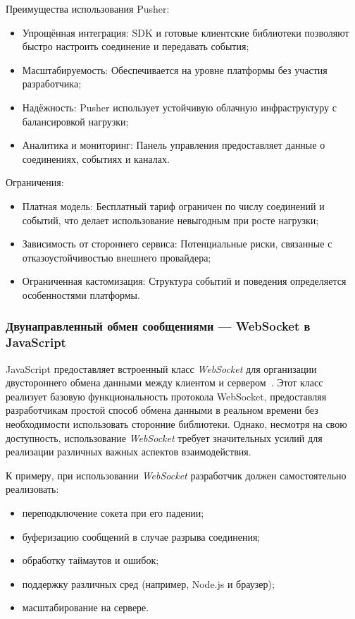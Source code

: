 Преимущества использования Pusher:
\begin{itemize}
  \item Упрощённая интеграция: SDK и готовые клиентские библиотеки позволяют быстро настроить соединение и передавать события;
  \item Масштабируемость: Обеспечивается на уровне платформы без участия разработчика;
  \item Надёжность: Pusher использует устойчивую облачную инфраструктуру с балансировкой нагрузки;
  \item Аналитика и мониторинг: Панель управления предоставляет данные о соединениях, событиях и каналах.
\end{itemize}

Ограничения:
\begin{itemize}
  \item Платная модель: Бесплатный тариф ограничен по числу соединений и событий, что делает использование невыгодным при росте нагрузки;
  \item Зависимость от стороннего сервиса: Потенциальные риски, связанные с отказоустойчивостью внешнего провайдера;
  \item Ограниченная кастомизация: Структура событий и поведения определяется особенностями платформы.
\end{itemize}

\subsubsection*{Двунаправленный обмен сообщениями — WebSocket в JavaScript}

JavaScript предоставляет встроенный класс \textit{WebSocket} для организации двустороннего обмена данными между клиентом и сервером~\cite{mdn_websocket_api}. Этот класс реализует базовую функциональность протокола WebSocket, предоставляя разработчикам простой способ обмена данными в реальном времени без необходимости использовать сторонние библиотеки. Однако, несмотря на свою доступность, использование \textit{WebSocket} требует значительных усилий для реализации различных важных аспектов взаимодействия.

К примеру, при использовании \textit{WebSocket} разработчик должен самостоятельно реализовать:
\begin{itemize}
  \item переподключение сокета при его падении;
  \item буферизацию сообщений в случае разрыва соединения;
  \item обработку таймаутов и ошибок;
  \item поддержку различных сред (например, Node.js и браузер);
  \item масштабирование на сервере.
\end{itemize}

